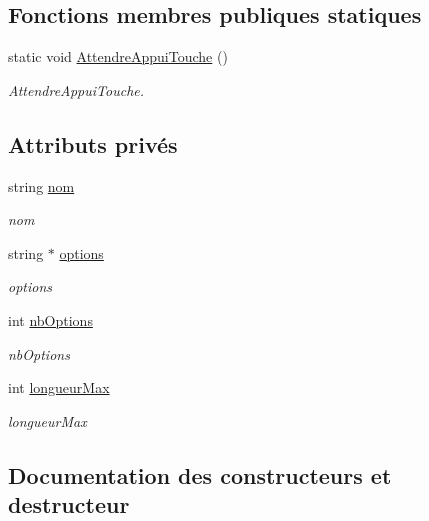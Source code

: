 \subsection*{Fonctions membres publiques statiques}
\begin{DoxyCompactItemize}
\item 
static void \hyperlink{class_menu_a6ddcaabf2fedb30f5136f3be655d60ce}{Attendre\+Appui\+Touche} ()
\begin{DoxyCompactList}\small\item\em Attendre\+Appui\+Touche. \end{DoxyCompactList}\end{DoxyCompactItemize}
\subsection*{Attributs privés}
\begin{DoxyCompactItemize}
\item 
string \hyperlink{class_menu_a99574cb51606811f697854859bc1ccc1}{nom}
\begin{DoxyCompactList}\small\item\em nom \end{DoxyCompactList}\item 
string $\ast$ \hyperlink{class_menu_aec975cfea9216420d5754ce2e9321390}{options}
\begin{DoxyCompactList}\small\item\em options \end{DoxyCompactList}\item 
int \hyperlink{class_menu_ad59953635d184fefcddf95015a761187}{nb\+Options}
\begin{DoxyCompactList}\small\item\em nb\+Options \end{DoxyCompactList}\item 
int \hyperlink{class_menu_a745c540589015b573d8214e1080e2a8e}{longueur\+Max}
\begin{DoxyCompactList}\small\item\em longueur\+Max \end{DoxyCompactList}\end{DoxyCompactItemize}


\subsection{Documentation des constructeurs et destructeur}
\mbox{\label{class_menu_a2733b73d7c4dff4b1db19afd45f255b9}} 
